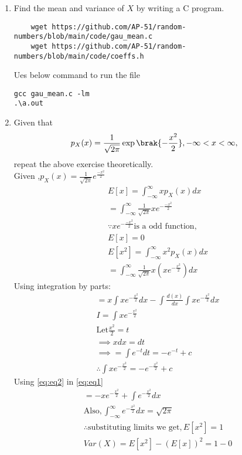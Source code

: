 \documentclass[journal,12pt,twocolumn]{IEEEtran}
\renewcommand\thesection{\arabic{section}}
\begin{document}
\begin{enumerate}[label=\thesection.\arabic*
,ref=\thesection.\theenumi]
\item Find the mean and variance of $X$ by writing a C program.
\solution 
\begin{lstlisting}
    wget https://github.com/AP-51/random-numbers/blob/main/code/gau_mean.c
    wget https://github.com/AP-51/random-numbers/blob/main/code/coeffs.h
\end{lstlisting}
Ues below command to run the file
\begin{lstlisting}
gcc gau_mean.c -lm 
.\a.out
\end{lstlisting}
\item Given that 
\begin{align}
p_{X}(x) = \frac{1}{\sqrt{2\pi}}\exp\brak{-\frac{x^2}{2}}, -\infty < x < \infty,
\end{align}
repeat the above exercise theoretically.\\
\solution
Given ,$p_{X}(x)=\frac{1}{\sqrt{2\pi}} e^{\frac{-x^2}{2}}$
\begin{align}
 &E[x]=\int_{-\infty}^{\infty} x p_{X}(x) dx\\
 &=\int_{-\infty}^{\infty} \frac{1}{\sqrt{2 \pi}} x e^{-\frac{-x^2}{2}}\\
  &\because x e^{-\frac{-x^2}{2}} \text{is a odd function},\\
  \nonumber
   &E[x]=0\\
 &E[x^2]=\int_{-\infty}^{\infty} x^2 p_{X}(x) dx\\
 &=\int_{-\infty}^{\infty} \frac{1}{\sqrt{2\pi}} x(xe^{-\frac{x^2}{2}}) dx
 \end{align}
  Using integration by parts:
  \begin{align}
   \label{eq:eq1}
 & =x\int xe^{-\frac{x^2}{2}} dx-\int\frac{d(x)}{dx} \int xe^{-\frac{x^2}{2}}dx\\
 &I=\int x e^{-\frac{x^2}{2}}\\
 &\text{Let} \frac{x^2}{2}=t \\
 &\implies x dx=dt\\
 &\implies =\int e^{-t} dt=-e^{-t} +c\\
 \label{eq:eq2}
 &\therefore \int x e^{-\frac{x^2}{2}}=-e^{-\frac{x^2}{2}} +c
 \end{align}
 Using \eqref{eq:eq2} in \eqref{eq:eq1}\\
 \begin{align}
&= -x e^{-\frac{x^2}{2}}+\int e^{-\frac{x^2}{2}} dx\\
&\text{Also} ,\int_{-\infty}^{\infty} e^{-\frac{x^2}{2}} dx=\sqrt{2 \pi} \\
&\therefore \text{substituting limits we get}, E[x^2]=1\\
 &Var(X)=E[x^2]-(E[x])^2=1-0
 \end{align}
\end{enumerate}
\end{document}
